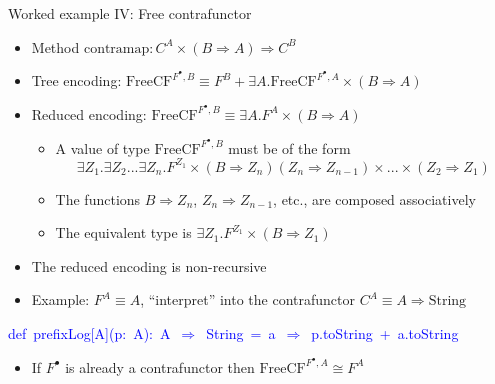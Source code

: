 \documentclass[english,,russian]{beamer}
\newenvironment{lyxcode}
  {\par\begin{list}{}{
    \setlength{\rightmargin}{\leftmargin}
    \setlength{\listparindent}{0pt}%
    \raggedright
    \setlength{\itemsep}{0pt}
    \setlength{\parsep}{0pt}
    \normalfont\ttfamily}%
   \def\{{\char`\{}
   \def\}{\char`\}}
   \def\textasciitilde{\char`\~}
   \item[]}
  {\end{list}}
\begin{document}
\begin{frame}{Worked example IV: Free contrafunctor}
\begin{itemize}
\item Method $\text{contramap}:C^{A}\times\left(B\Rightarrow A\right)\Rightarrow C^{B}$ 
\item Tree encoding: $\text{FreeCF}^{F^{\bullet},B}\equiv F^{B}+\exists A.\text{FreeCF}^{F^{\bullet},A}\times\left(B\Rightarrow A\right)$
\item Reduced encoding: $\text{FreeCF}^{F^{\bullet},B}\equiv\exists A.F^{A}\times\left(B\Rightarrow A\right)$ 
\begin{itemize}
\item A value of type $\text{FreeCF}^{F^{\bullet},B}$ must be of the form
{\footnotesize{}
\[
\exists Z_{1}.\exists Z_{2}...\exists Z_{n}.F^{Z_{1}}\times\left(B\Rightarrow Z_{n}\right)\left(Z_{n}\Rightarrow Z_{n-1}\right)\times...\times\left(Z_{2}\Rightarrow Z_{1}\right)
\]
}{\footnotesize\par}
\item The functions $B\Rightarrow Z_{n}$, $Z_{n}\Rightarrow Z_{n-1}$,
etc., are composed associatively
\item The equivalent type is $\exists Z_{1}.F^{Z_{1}}\times\left(B\Rightarrow Z_{1}\right)$
\end{itemize}
\item The reduced encoding is non-recursive
\item Example: $F^{A}\equiv A$, ``interpret'' into the contrafunctor
$C^{A}\equiv A\Rightarrow\text{String}$
\end{itemize}
\begin{lyxcode}
{\footnotesize{}\vspace{-0.35cm}}\textcolor{blue}{\footnotesize{}def~prefixLog{[}A{]}(p:~A):~A~$\Rightarrow$~String~=~a~$\Rightarrow$~p.toString~+~a.toString}{\footnotesize\par}
\end{lyxcode}
\begin{itemize}
\item If $F^{\bullet}$ is already a contrafunctor then $\text{FreeCF}^{F^{\bullet},A}\cong F^{A}$
\end{itemize}
\end{frame}
\end{document}
